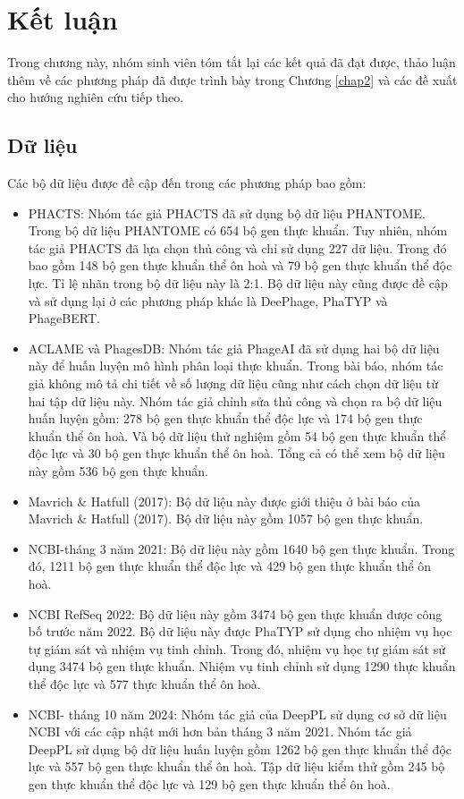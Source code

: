 
\chapter{Kết luận}
Trong chương này, nhóm sinh viên tóm tắt lại các kết quả đã đạt được, thảo luận thêm về các phương pháp đã được trình bày trong Chương \ref{chap2} và các đề xuất cho hướng nghiên cứu tiếp theo.

\section{Dữ liệu}
Các bộ dữ liệu được đề cập đến trong các phương pháp bao gồm:
\begin{itemize}
    \item PHACTS: Nhóm tác giả PHACTS đã sử dụng bộ dữ liệu PHANTOME. Trong bộ dữ liệu PHANTOME có 654 bộ gen thực khuẩn. Tuy nhiên, nhóm tác giả PHACTS đã lựa chọn thủ công và chỉ sử dụng 227 dữ liệu. Trong đó bao gồm 148 bộ gen thực khuẩn thể ôn hoà và 79 bộ gen thực khuẩn thể độc lực. Tỉ lệ nhãn trong bộ dữ liệu này là 2:1. Bộ dữ liệu này cũng được đề cập và sử dụng lại ở các phương pháp khác là DeePhage, PhaTYP và PhageBERT.
    \item ACLAME và PhagesDB: Nhóm tác giả PhageAI đã sử dụng hai bộ dữ liệu này để huấn luyện mô hình phân loại thực khuẩn. Trong bài báo, nhóm tác giả không mô tả chi tiết về số lượng dữ liệu cũng như cách chọn dữ liệu từ hai tập dữ liệu này. Nhóm tác giả chỉnh sửa thủ công và chọn ra bộ dữ liệu huấn luyện gồm: 278 bộ gen thực khuẩn thể độc lực và 174 bộ gen thực khuẩn thể ôn hoà. Và bộ dữ liệu thử nghiệm gồm 54 bộ gen thực khuẩn thể độc lực và 30 bộ gen thực khuẩn thể ôn hoà. Tổng cả có thể xem bộ dữ liệu này gồm 536 bộ gen thực khuẩn.
    \item Mavrich \& Hatfull (2017): Bộ dữ liệu này được giới thiệu ở bài báo của Mavrich \& Hatfull (2017). Bộ dữ liệu này gồm 1057 bộ gen thực khuẩn. 
    \item NCBI-tháng 3 năm 2021: Bộ dữ liệu này gồm 1640 bộ gen thực khuẩn. Trong đó, 1211 bộ gen thực khuẩn thể độc lực và 429 bộ gen thực khuẩn thể ôn hoà. 
    \item NCBI RefSeq 2022: Bộ dữ liệu này gồm 3474 bộ gen thực khuẩn được công bố trước năm 2022. Bộ dữ liệu này được PhaTYP sử dụng cho nhiệm vụ học tự giám sát và nhiệm vụ tinh chỉnh. Trong đó, nhiệm vụ học tự giám sát sử dụng 3474 bộ gen thực khuẩn. Nhiệm vụ tinh chỉnh sử dụng 1290 thực khuẩn thể độc lực và 577 thực khuẩn thể ôn hoà.
    \item NCBI- tháng 10 năm 2024: Nhóm tác giả của DeepPL sử dụng cơ sở dữ liệu NCBI với các cập nhật mới hơn bản tháng 3 năm 2021. Nhóm tác giả DeepPL sử dụng bộ dữ liệu huấn luyện gồm 1262 bộ gen thực khuẩn thể độc lực và 557 bộ gen thực khuẩn thể ôn hoà. Tập dữ liệu kiểm thử gồm 245 bộ gen thực khuẩn thể độc lực và 129 bộ gen thực khuẩn thể ôn hoà. 
\end{itemize}


